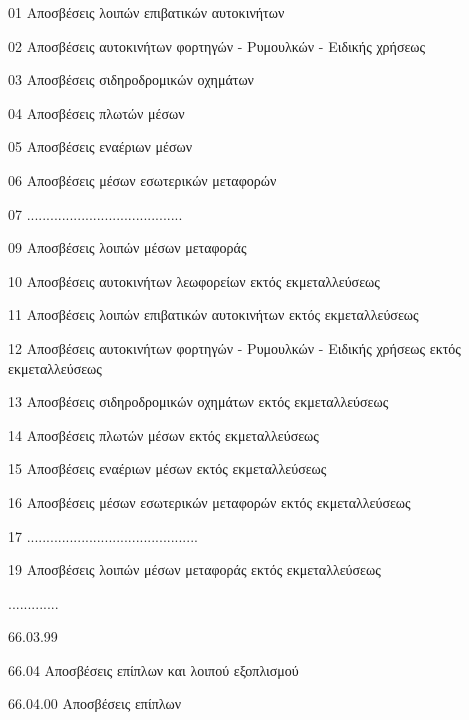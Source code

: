 \documentclass[A4,10pt,greek]{book}
\begin{document}
                               01   Αποσβέσεις λοιπών επιβατικών αυτοκινήτων

                               02    Αποσβέσεις αυτοκινήτων φορτηγών - Ρυμουλκών - Ειδικής
                                       χρήσεως

                               03    Αποσβέσεις σιδηροδρομικών οχημάτων

                               04    Αποσβέσεις πλωτών μέσων

                               05    Αποσβέσεις εναέριων μέσων

                               06    Αποσβέσεις μέσων εσωτερικών μεταφορών

                               07    ........................................

                               09    Αποσβέσεις λοιπών μέσων μεταφοράς

                               10    Αποσβέσεις αυτοκινήτων λεωφορείων εκτός εκμεταλλεύσεως

                               11    Αποσβέσεις λοιπών επιβατικών αυτοκινήτων εκτός
                                       εκμεταλλεύσεως

                               12    Αποσβέσεις αυτοκινήτων φορτηγών - Ρυμουλκών - Ειδικής
                                       χρήσεως εκτός εκμεταλλεύσεως

                               13    Αποσβέσεις σιδηροδρομικών οχημάτων εκτός εκμεταλλεύσεως

                               14    Αποσβέσεις πλωτών μέσων εκτός εκμεταλλεύσεως

                               15    Αποσβέσεις εναέριων μέσων εκτός εκμεταλλεύσεως

                               16    Αποσβέσεις μέσων εσωτερικών μεταφορών
                                       εκτός εκμεταλλεύσεως

                               17    ............................................

                               19    Αποσβέσεις λοιπών μέσων μεταφοράς εκτός εκμεταλλεύσεως

                     .............

                     66.03.99

        66.04    Αποσβέσεις επίπλων και λοιπού εξοπλισμού

                     66.04.00    Αποσβέσεις επίπλων
\end{document}
